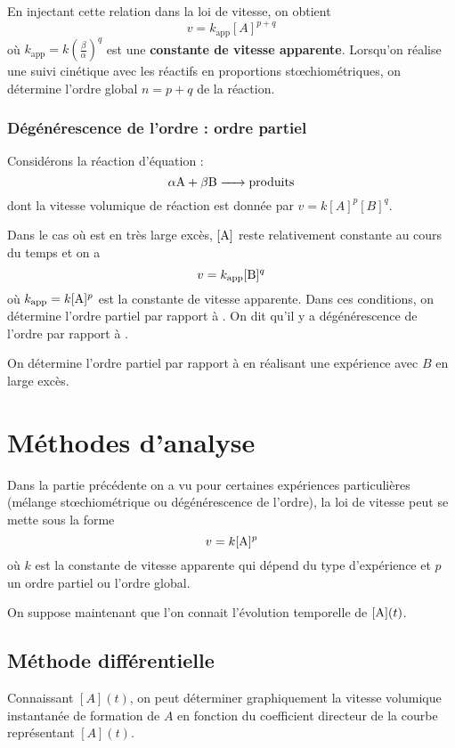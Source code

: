 \documentclass{cours}
\begin{document}
En injectant cette relation dans la loi de vitesse, on obtient 
\[ v = k_\text{app}[A]^{p+q}\]
où $k_\text{app}=k \left( \frac{\beta}{\alpha} \right)^q $ est une \textbf{constante de vitesse apparente}.
Lorsqu'on réalise une suivi cinétique avec les réactifs en proportions stœchiométriques, on détermine l'ordre global $n=p+q$ de la réaction.

\subsubsection{Dégénérescence de l'ordre : ordre partiel}%
\label{ssub:degenerescence_de_l_ordre_ordre_partiel}
Considérons la réaction d'équation :
\[
\ce{\alpha A + \beta B -> produits}
\]
 dont la vitesse volumique de réaction est donnée par $v=k[A]^p [B]^q$.

Dans le cas où  est en très large excès, $[\ce{A}]$ reste relativement constante au cours du temps et on a 
\[
v = k_\text{app}[\ce{B}]^q
\]
où $k_\text{app}=k[\ce{A}]^p$ est la constante de vitesse apparente. Dans ces conditions, on détermine l'ordre partiel par rapport à . On dit qu'il y a dégénérescence de l'ordre par rapport à .

On détermine l'ordre partiel par rapport à  en réalisant une expérience avec $B$ en large excès.

\section{Méthodes d'analyse}%
\label{sec:methodes_d_analyse}
Dans la partie précédente on a vu pour certaines expériences particulières (mélange stœchiométrique ou dégénérescence de l'ordre), la loi de vitesse peut se mette sous la forme 
\[
v = k [\ce{A}]^p
\]
où $k$ est la constante de vitesse apparente qui dépend du type d'expérience et $p$ un ordre partiel ou l'ordre global.

On suppose maintenant que l'on connait l'évolution temporelle de $[\ce{A}](t)$. 

\subsection{Méthode différentielle}%
\label{sub:methode_differentielle}
Connaissant $[A](t)$,  on peut déterminer graphiquement la vitesse volumique instantanée de formation de $A$ en fonction du coefficient directeur de la courbe représentant $[A](t)$.
\end{document}
